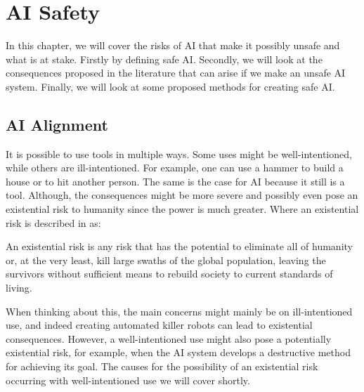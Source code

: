 \documentclass[12pt,A4]{report}
\theoremstyle{definition}
\begin{document}


\chapter{AI Safety}
In this chapter, we will cover the risks of AI that make it possibly unsafe and what is at stake. Firstly by defining safe AI. Secondly, we will look at the consequences proposed in the literature that can arise if we make an unsafe AI system. Finally, we will look at some proposed methods for creating safe AI. 

\section{AI Alignment}
It is possible to use tools in multiple ways. Some uses might be well-intentioned, while others are ill-intentioned. For example, one can use a hammer to build a house or to hit another person. The same is the case for AI because it still is a tool. Although, the consequences might be more severe and possibly even pose an existential risk to humanity since the power is much greater. Where an existential risk is described in \citet{FLI} as:
\begin{displayquote}
An existential risk is any risk that has the potential to eliminate all of humanity or, at the very least, kill large swaths of the global population, leaving the survivors without sufficient means to rebuild society to current standards of living.
\end{displayquote}

When thinking about this, the main concerns might mainly be on ill-intentioned use, and indeed creating automated killer robots can lead to existential consequences. However, a well-intentioned use might also pose a potentially existential risk, for example, when the AI system develops a destructive method for achieving its goal. The causes for the possibility of an existential risk occurring with well-intentioned use we will cover shortly. 

\end{document}
